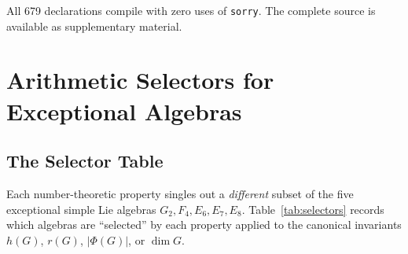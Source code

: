 \documentclass[11pt]{amsart}
\theoremstyle{plain}
\theoremstyle{definition}
\theoremstyle{remark}
\renewcommand{\Phi}{\varPhi}
\begin{document}
All 679 declarations compile with zero uses of \texttt{sorry}.  The
complete source is available as supplementary material.



\section{Arithmetic Selectors for Exceptional Algebras}%
\label{sec:arithmetic-selectors}

\subsection{The Selector Table}\label{subsec:selector-table}

Each number-theoretic property singles out a \emph{different} subset of the five
exceptional simple Lie algebras $G_2, F_4, E_6, E_7, E_8$.
Table~\ref{tab:selectors} records which algebras are ``selected'' by each
property applied to the canonical invariants $h(G)$, $r(G)$, $|\Phi(G)|$,
or $\dim G$.
\end{document}
